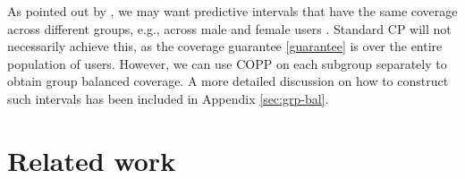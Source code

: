 \begin{importantresultwithtitle}[title=Towards group balanced coverage]\noindent \label{sec:group_balanced_cov}

As pointed out by \cite{conf-bates}, we may want predictive intervals that have the same coverage across different groups, e.g., across male and female users \citep{Romano2020With}. Standard CP will not necessarily achieve this, as the coverage guarantee \eqref{guarantee} is over the entire population of users.
However, we can use COPP on each subgroup separately to obtain group balanced coverage. A more detailed discussion on how to construct such intervals has been included in Appendix \ref{sec:grp-bal}.
\end{importantresultwithtitle}


\section{Related work}\label{sec:related_work}
